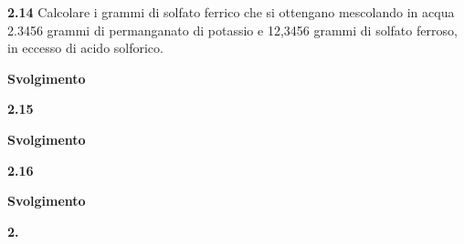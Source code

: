 

\vspace{0.2cm}\textbf{2.14} Calcolare i grammi di solfato ferrico che si ottengano mescolando in acqua 2.3456 grammi di permanganato di potassio  e 12,3456 grammi di solfato ferroso, in eccesso di acido solforico.

\large\textbf{Svolgimento}\normalsize

\vspace{0.2cm}

\vspace{0.2cm}\textbf{2.15} 

\large\textbf{Svolgimento}\normalsize

\vspace{0.2cm}

\vspace{0.2cm}\textbf{2.16} 

\large\textbf{Svolgimento}\normalsize

\vspace{0.2cm}

\vspace{0.2cm}\textbf{2.} 